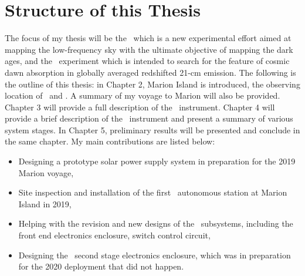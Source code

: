 \section{Structure of this Thesis}

The focus of my thesis will be the \albatros\ which is a new experimental effort aimed at mapping the low-frequency sky with the ultimate objective of mapping the dark ages, and the \prizm\ experiment which is intended to search for the feature of cosmic dawn absorption in globally averaged redshifted 21-cm emission. The following is the outline of this thesis: in Chapter 2, Marion Island is introduced, the observing location of \prizm\ and \albatros. A summary of my voyage to Marion will also be provided. Chapter 3 will provide a full description of the \albatros\ instrument. Chapter 4 will provide a brief description of the \prizm\ instrument and present a summary of various system stages. In Chapter 5, preliminary results will be presented and conclude in the same chapter. My main contributions are listed below:
\begin{itemize}
	\item Designing a prototype solar power supply system in preparation for the 2019 Marion voyage, 
	\item Site inspection and installation of the first \albatros\ autonomous station at Marion Island in 2019,
	\item Helping with the revision and new designs of the \prizm\ subsystems, including the front end electronics enclosure, switch control circuit, 
	\item Designing the \prizm\ second stage electronics enclosure, which was in preparation for the 2020 deployment that did not happen.
\end{itemize}
